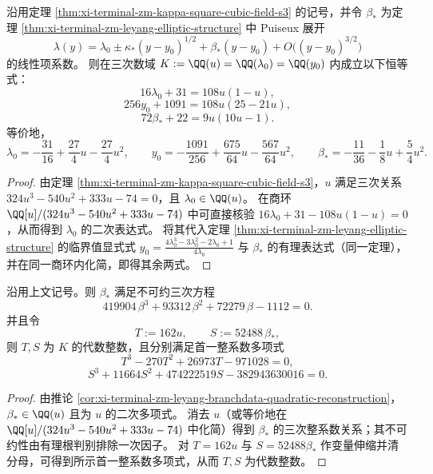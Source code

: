 \begin{corollary}\label{cor:xi-terminal-zm-leyang-branchdata-quadratic-reconstruction}
沿用定理 \ref{thm:xi-terminal-zm-kappa-square-cubic-field-s3} 的记号，并令 \(\beta_*\) 为定理 \ref{thm:xi-terminal-zm-leyang-elliptic-structure} 中 Puiseux 展开
\[
\lambda(y)=\lambda_0\pm \kappa_*(y-y_0)^{1/2}+\beta_*(y-y_0)+O\bigl((y-y_0)^{3/2}\bigr)
\]
的线性项系数。
则在三次数域 \(K:=\QQ(u)=\QQ(\lambda_0)=\QQ(y_0)\) 内成立以下恒等式：
\[
16\lambda_0+31=108u(1-u),
\]
\[
256y_0+1091=108u(25-21u),
\]
\[
72\beta_*+22=9u(10u-1).
\]
等价地，
\[
\lambda_0=-\frac{31}{16}+\frac{27}{4}u-\frac{27}{4}u^2,\qquad
y_0=-\frac{1091}{256}+\frac{675}{64}u-\frac{567}{64}u^2,\qquad
\beta_*=-\frac{11}{36}-\frac{1}{8}u+\frac{5}{4}u^2.
\]
\end{corollary}
\begin{proof}
由定理 \ref{thm:xi-terminal-zm-kappa-square-cubic-field-s3}，\(u\) 满足三次关系 \(324u^{3}-540u^{2}+333u-74=0\)，且 \(\lambda_0\in\QQ(u)\)。
在商环 \(\QQ[u]/(324u^{3}-540u^{2}+333u-74)\) 中可直接核验
\(
16\lambda_0+31-108u(1-u)=0
\)，从而得到 \(\lambda_0\) 的二次表达式。
将其代入定理 \ref{thm:xi-terminal-zm-leyang-elliptic-structure} 的临界值显式式
\(
y_0=\frac{4\lambda_0^3-3\lambda_0^2-2\lambda_0+1}{4\lambda_0}
\)
与 \(\beta_*\) 的有理表达式（同一定理），并在同一商环内化简，即得其余两式。
\end{proof}

\begin{corollary}\label{cor:xi-terminal-zm-beta-minpoly-integralization}
沿用上文记号。则 \(\beta_*\) 满足不可约三次方程
\[
419904\,\beta^{3}+93312\,\beta^{2}+72279\,\beta-1112=0.
\]
并且令
\[
T:=162u,\qquad S:=52488\,\beta_*,
\]
则 \(T,S\) 为 \(K\) 的代数整数，且分别满足首一整系数多项式
\[
T^{3}-270T^{2}+26973T-971028=0,
\]
\[
S^{3}+11664S^{2}+474222519S-382943630016=0.
\]
\end{corollary}
\begin{proof}
由推论 \ref{cor:xi-terminal-zm-leyang-branchdata-quadratic-reconstruction}，\(\beta_*\in\QQ(u)\) 且为 \(u\) 的二次多项式。
消去 \(u\)（或等价地在 \(\QQ[u]/(324u^{3}-540u^{2}+333u-74)\) 中化简）得到 \(\beta_*\) 的三次整系数关系；其不可约性由有理根判别排除一次因子。
对 \(T=162u\) 与 \(S=52488\beta_*\) 作变量伸缩并清分母，可得到所示首一整系数多项式，从而 \(T,S\) 为代数整数。
\end{proof}

